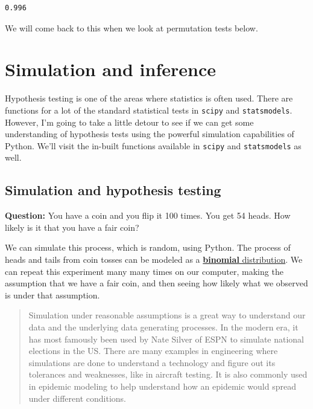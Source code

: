 \documentclass[
  letterpaper,
]{scrbook}
\begin{document}
\begin{verbatim}
0.996
\end{verbatim}

We will come back to this when we look at permutation tests below.

\hypertarget{simulation-and-inference}{%
\section{Simulation and inference}\label{simulation-and-inference}}

Hypothesis testing is one of the areas where statistics is often used. There are functions for a lot of the standard statistical tests in \texttt{scipy} and \texttt{statsmodels}. However, I'm going to take a little detour to see if we can get some understanding of hypothesis tests using the powerful simulation capabilities of Python. We'll visit the in-built functions available in \texttt{scipy} and \texttt{statsmodels} as well.

\hypertarget{simulation-and-hypothesis-testing}{%
\subsection{Simulation and hypothesis testing}\label{simulation-and-hypothesis-testing}}

\textbf{Question:} You have a coin and you flip it 100 times. You get 54 heads. How likely is it that you have a fair coin?

We can simulate this process, which is random, using Python. The process of heads and tails from coin tosses can be modeled as a \href{https://en.wikipedia.org/wiki/Binomial_distribution}{\textbf{binomial} distribution}. We can repeat this experiment many many times on our computer, making the assumption that we have a fair coin, and then seeing how likely what we observed is under that assumption.

\begin{quote}
Simulation under reasonable assumptions is a great way to understand our data and the underlying data generating processes. In the modern era, it has most famously been used by Nate Silver of ESPN to simulate national elections in the US. There are many examples in engineering where simulations are done to understand a technology and figure out its tolerances and weaknesses, like in aircraft testing. It is also commonly used in epidemic modeling to help understand how an epidemic would spread under different conditions.
\end{quote}
\end{document}

